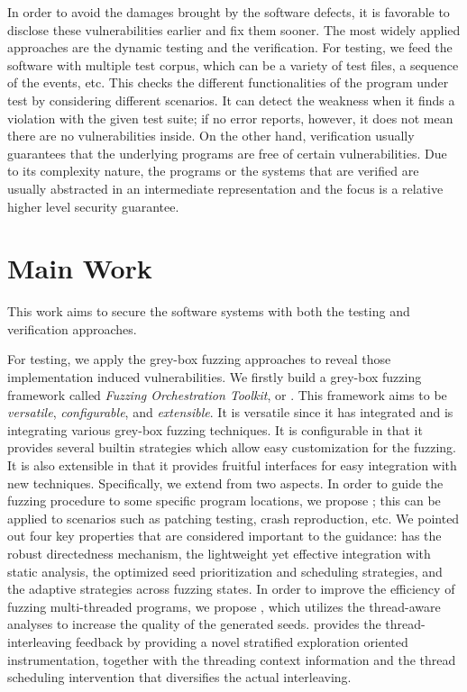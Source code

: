 In order to avoid the damages brought by the software defects, it is favorable to disclose these vulnerabilities earlier and fix them sooner. The most widely applied approaches are the dynamic testing and the verification. For testing, we feed the software with multiple test corpus, which can be a variety of test files, a sequence of the events, etc. This checks the different functionalities of the program under test by considering different scenarios. It can detect the weakness when it finds a violation with the given test suite; if no error reports, however, it does not mean there are no vulnerabilities inside. On the other hand, verification usually guarantees that the underlying programs are free of certain vulnerabilities. Due to its complexity nature, the programs or the systems that are verified are usually abstracted in an intermediate representation and the focus is a relative higher level security guarantee.

\section{Main Work}

This work aims to secure the software systems with both the testing and verification approaches.

For testing, we apply the grey-box fuzzing approaches to reveal those implementation induced vulnerabilities. We firstly build a grey-box fuzzing framework called \emph{Fuzzing Orchestration Toolkit}, or \FOT. This framework aims to be \emph{versatile}, \emph{configurable}, and \emph{extensible}. It is versatile since it has integrated and is integrating various grey-box fuzzing techniques. It is configurable in that it provides several builtin strategies which allow easy customization for the fuzzing. It is also extensible in that it provides fruitful interfaces for easy integration with new techniques. Specifically, we extend \FOT from two aspects. In order to guide the fuzzing procedure to some specific program locations, we propose \dFOT; this can be applied to scenarios such as patching testing, crash reproduction, etc. We pointed out four key properties that are considered important to the guidance: \dFOT has the robust directedness mechanism, the lightweight yet effective integration with static analysis, the optimized seed prioritization and scheduling strategies, and the adaptive strategies across fuzzing states. In order to improve the efficiency of fuzzing multi-threaded programs, we propose \mtfuzz, which utilizes the thread-aware analyses to increase the quality of the generated seeds. \mtfuzz provides the thread-interleaving feedback by providing a novel stratified exploration oriented instrumentation, together with the threading context information and the thread scheduling intervention that diversifies the actual interleaving.

